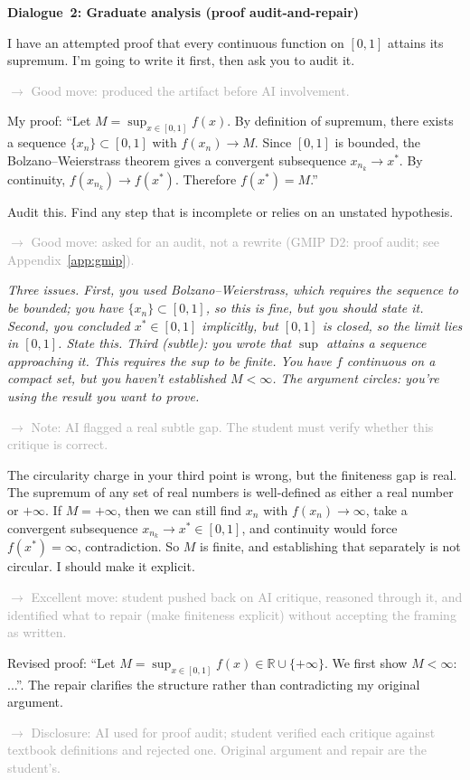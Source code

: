 \documentclass{SIAMbook2023}
\newenvironment{dialogue}[1]%
  {\par\medskip\noindent\textbf{\textcolor{guideblue}{#1}}\par\smallskip
   \begin{list}{}{\setlength{\leftmargin}{1.5em}\setlength{\rightmargin}{0.5em}\setlength{\itemsep}{0.4em}\setlength{\topsep}{0pt}}}
  {\end{list}\par\medskip}
\newcommand{\studentturn}[1]{\item[\textbf{Student.}] #1}
\newcommand{\aiturn}[1]{\item[\textbf{AI.}] \textit{#1}}
\newcommand{\dialogueannotate}[1]{\par\smallskip\hspace{2em}\textcolor{darkgray}{\footnotesize\textsf{$\rightarrow$ #1}}\par}
\begin{document}
\begin{dialogue}{Dialogue~2: Graduate analysis (proof audit-and-repair)}
\studentturn{I have an attempted proof that every continuous function on $[0,1]$ attains its supremum. I'm going to write it first, then ask you to audit it.}
\dialogueannotate{Good move: produced the artifact before AI involvement.}

\studentturn{My proof: ``Let $M = \sup_{x \in [0,1]} f(x)$. By definition of supremum, there exists a sequence $\{x_n\} \subset [0,1]$ with $f(x_n) \to M$. Since $[0,1]$ is bounded, the Bolzano--Weierstrass theorem gives a convergent subsequence $x_{n_k} \to x^*$. By continuity, $f(x_{n_k}) \to f(x^*)$. Therefore $f(x^*) = M$.''}

\studentturn{Audit this. Find any step that is incomplete or relies on an unstated hypothesis.}
\dialogueannotate{Good move: asked for an audit, not a rewrite (GMIP D2: proof audit; see Appendix~\ref{app:gmip}).}

\aiturn{Three issues. First, you used Bolzano--Weierstrass, which requires the sequence to be bounded; you have $\{x_n\} \subset [0,1]$, so this is fine, but you should state it. Second, you concluded $x^* \in [0,1]$ implicitly, but $[0,1]$ is closed, so the limit lies in $[0,1]$. State this. Third (subtle): you wrote that $\sup$ attains a sequence approaching it. This requires the sup to be finite. You have $f$ continuous on a compact set, but you haven't established $M < \infty$. The argument circles: you're using the result you want to prove.}
\dialogueannotate{Note: AI flagged a real subtle gap. The student must verify whether this critique is correct.}

\studentturn{The circularity charge in your third point is wrong, but the finiteness gap is real. The supremum of any set of real numbers is well-defined as either a real number or $+\infty$. If $M = +\infty$, then we can still find $x_n$ with $f(x_n) \to \infty$, take a convergent subsequence $x_{n_k} \to x^* \in [0,1]$, and continuity would force $f(x^*) = \infty$, contradiction. So $M$ is finite, and establishing that separately is not circular. I should make it explicit.}
\dialogueannotate{Excellent move: student pushed back on AI critique, reasoned through it, and identified what to repair (make finiteness explicit) without accepting the framing as written.}

\studentturn{Revised proof: ``Let $M = \sup_{x \in [0,1]} f(x) \in \mathbb{R} \cup \{+\infty\}$. We first show $M < \infty$: ...''. The repair clarifies the structure rather than contradicting my original argument.}
\dialogueannotate{Disclosure: AI used for proof audit; student verified each critique against textbook definitions and rejected one. Original argument and repair are the student's.}
\end{dialogue}
\end{document}
